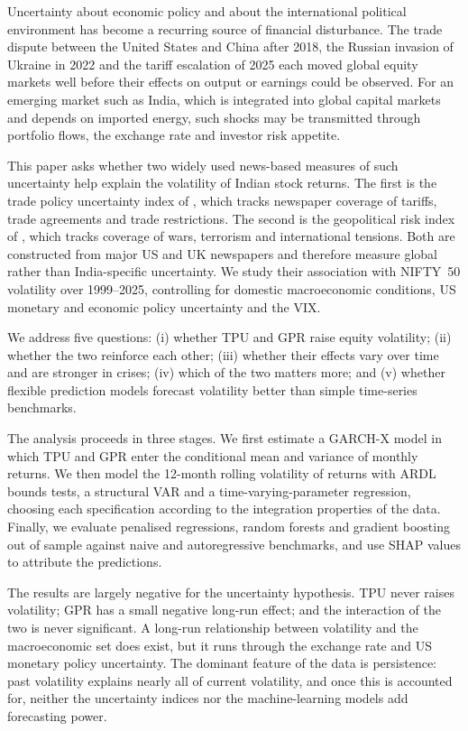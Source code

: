 \documentclass[10pt,twocolumn,a4paper]{article}
\begin{document}
Uncertainty about economic policy and about the international political environment has become a recurring source of financial disturbance. The trade dispute between the United States and China after 2018, the Russian invasion of Ukraine in 2022 and the tariff escalation of 2025 each moved global equity markets well before their effects on output or earnings could be observed. For an emerging market such as India, which is integrated into global capital markets and depends on imported energy, such shocks may be transmitted through portfolio flows, the exchange rate and investor risk appetite.

This paper asks whether two widely used news-based measures of such uncertainty help explain the volatility of Indian stock returns. The first is the trade policy uncertainty index of \citet{caldara2020}, which tracks newspaper coverage of tariffs, trade agreements and trade restrictions. The second is the geopolitical risk index of \citet{caldara2022}, which tracks coverage of wars, terrorism and international tensions. Both are constructed from major US and UK newspapers and therefore measure global rather than India-specific uncertainty. We study their association with NIFTY~50 volatility over 1999--2025, controlling for domestic macroeconomic conditions, US monetary and economic policy uncertainty and the VIX.

We address five questions: (i) whether TPU and GPR raise equity volatility; (ii) whether the two reinforce each other; (iii) whether their effects vary over time and are stronger in crises; (iv) which of the two matters more; and (v) whether flexible prediction models forecast volatility better than simple time-series benchmarks.

The analysis proceeds in three stages. We first estimate a GARCH-X model in which TPU and GPR enter the conditional mean and variance of monthly returns. We then model the 12-month rolling volatility of returns with ARDL bounds tests, a structural VAR and a time-varying-parameter regression, choosing each specification according to the integration properties of the data. Finally, we evaluate penalised regressions, random forests and gradient boosting out of sample against naive and autoregressive benchmarks, and use SHAP values to attribute the predictions.

The results are largely negative for the uncertainty hypothesis. TPU never raises volatility; GPR has a small negative long-run effect; and the interaction of the two is never significant. A long-run relationship between volatility and the macroeconomic set does exist, but it runs through the exchange rate and US monetary policy uncertainty. The dominant feature of the data is persistence: past volatility explains nearly all of current volatility, and once this is accounted for, neither the uncertainty indices nor the machine-learning models add forecasting power.
\end{document}
